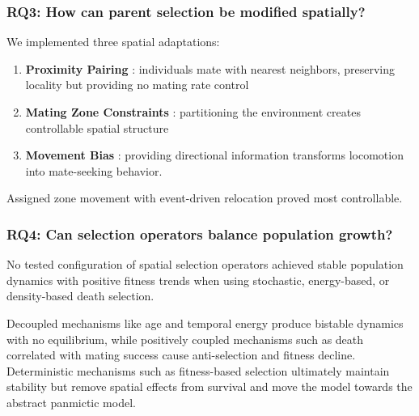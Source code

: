 \documentclass[dvipsnames,format=sigconf,anonymous=false,review=false]{acmart}
\begin{document}
\subsubsection*{RQ3: How can parent selection be modified spatially?}

We implemented three spatial adaptations: 
\begin{enumerate}
    \item \textbf{Proximity Pairing} : individuals mate with nearest neighbors, preserving locality but providing no mating rate control
    \item \textbf{Mating Zone Constraints} : partitioning the environment creates controllable spatial structure
    \item \textbf{Movement Bias} : providing directional information transforms locomotion into mate-seeking behavior.
\end{enumerate}
Assigned zone movement with event-driven relocation proved most controllable.


\subsubsection*{RQ4: Can selection operators balance population growth?}

No tested configuration of spatial selection operators achieved stable population dynamics with positive fitness trends when using stochastic, energy-based, or density-based death selection.


Decoupled mechanisms like age and temporal energy produce bistable dynamics with no equilibrium, while positively coupled mechanisms such as death correlated with mating success cause anti-selection and fitness decline. Deterministic mechanisms such as fitness-based selection ultimately maintain stability but remove spatial effects from survival and move the model towards the abstract panmictic model.
\end{document}
